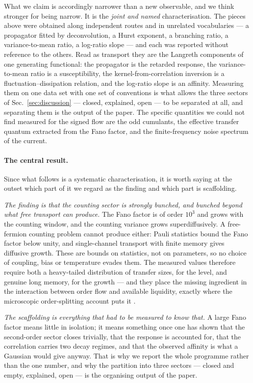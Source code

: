 \documentclass[aps,pre,twocolumn,superscriptaddress,floatfix,nofootinbib]{revtex4-2}
\begin{document}
What we claim is accordingly narrower than a new observable, and we think
stronger for being narrow. It is the \emph{joint and named} characterisation.
The pieces above were obtained along independent routes and in unrelated
vocabularies --- a propagator fitted by deconvolution, a Hurst exponent, a
branching ratio, a variance-to-mean ratio, a log-ratio slope --- and each was
reported without reference to the others. Read as transport they are the
Langreth components of one generating functional: the propagator is the
retarded response, the variance-to-mean ratio is a susceptibility, the
kernel-from-correlation inversion is a fluctuation--dissipation relation, and
the log-ratio slope is an affinity. Measuring them on one data set with one
set of conventions is what allows the three sectors of
Sec.~\ref{sec:discussion} --- closed, explained, open --- to be separated at
all, and separating them is the output of the paper. The specific quantities
we could not find measured for the signed flow are the odd cumulants, the
effective transfer quantum extracted from the Fano factor, and the
finite-frequency noise spectrum of the current.

\paragraph*{The central result.}
Since what follows is a systematic characterisation, it is worth saying at the
outset which part of it we regard as the finding and which part is scaffolding.

\emph{The finding is that the counting sector is strongly bunched, and bunched
beyond what free transport can produce.} The Fano factor is of order $10^{3}$
and grows with the counting window, and the counting variance grows
superdiffusively. A free-fermion counting problem cannot produce either: Pauli
statistics bound the Fano factor below unity, and single-channel transport with
finite memory gives diffusive growth. These are bounds on statistics, not on
parameters, so no choice of coupling, bias or temperature evades them. The
measured values therefore require both a heavy-tailed distribution of transfer
sizes, for the level, and genuine long memory, for the growth --- and they place
the missing ingredient in the interaction between order flow and available
liquidity, exactly where the microscopic order-splitting account puts it
\cite{lillo2005,sato2023prl}.

\emph{The scaffolding is everything that had to be measured to know that.} A
large Fano factor means little in isolation; it means something once one has
shown that the second-order sector closes trivially, that the response is
accounted for, that the correlation carries two decay regimes, and that the
observed affinity is what a Gaussian would give anyway. That is why we report
the whole programme rather than the one number, and why the partition into
three sectors --- closed and empty, explained, open --- is the organising output
of the paper.
\end{document}
